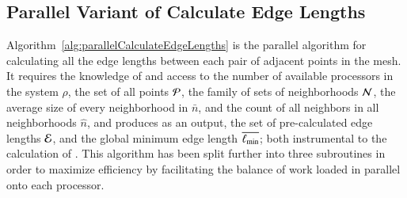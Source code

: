 %
%
\subsection{Parallel Variant of Calculate Edge Lengths}
\label{ch6sCELPssPVCEL}
Algorithm~\ref{alg:parallelCalculateEdgeLengths} is the parallel algorithm for calculating all the edge lengths between each pair of adjacent points in the mesh. It requires the knowledge of and access to the number of available processors in the system $\rho$, the set of all points $\mathcal{P}$, the family of sets of neighborhoods $\mathcal{N}$, the average size of every neighborhood in $\bar{n}$, and the count of all neighbors in all neighborhoods $\hat{n}$, and produces as an output, the set of pre-calculated edge lengths $\mathcal{E}$, and the global minimum edge length $\overline{\ell_\text{min}}$; both instrumental to the calculation of . This algorithm has been split further into three subroutines in order to maximize efficiency by facilitating the balance of work loaded in parallel onto each processor.

